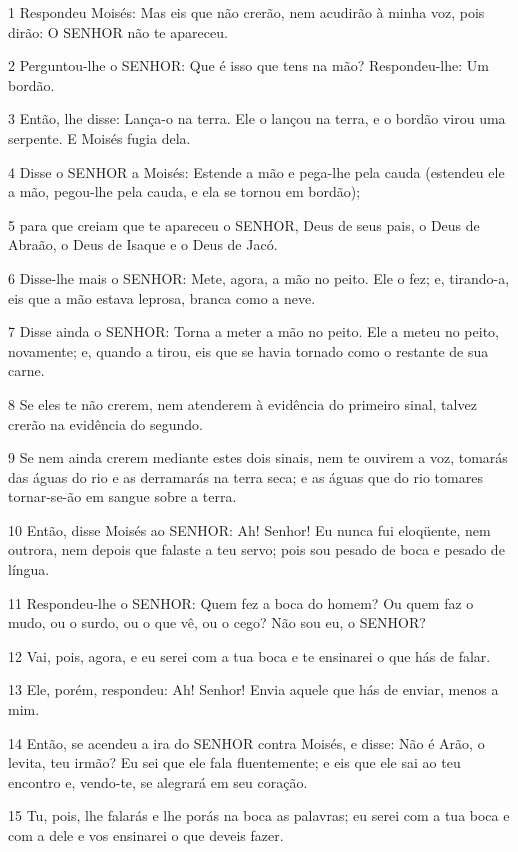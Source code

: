 \par 1 Respondeu Moisés: Mas eis que não crerão, nem acudirão à minha voz, pois dirão: O SENHOR não te apareceu.
\par 2 Perguntou-lhe o SENHOR: Que é isso que tens na mão? Respondeu-lhe: Um bordão.
\par 3 Então, lhe disse: Lança-o na terra. Ele o lançou na terra, e o bordão virou uma serpente. E Moisés fugia dela.
\par 4 Disse o SENHOR a Moisés: Estende a mão e pega-lhe pela cauda (estendeu ele a mão, pegou-lhe pela cauda, e ela se tornou em bordão);
\par 5 para que creiam que te apareceu o SENHOR, Deus de seus pais, o Deus de Abraão, o Deus de Isaque e o Deus de Jacó.
\par 6 Disse-lhe mais o SENHOR: Mete, agora, a mão no peito. Ele o fez; e, tirando-a, eis que a mão estava leprosa, branca como a neve.
\par 7 Disse ainda o SENHOR: Torna a meter a mão no peito. Ele a meteu no peito, novamente; e, quando a tirou, eis que se havia tornado como o restante de sua carne.
\par 8 Se eles te não crerem, nem atenderem à evidência do primeiro sinal, talvez crerão na evidência do segundo.
\par 9 Se nem ainda crerem mediante estes dois sinais, nem te ouvirem a voz, tomarás das águas do rio e as derramarás na terra seca; e as águas que do rio tomares tornar-se-ão em sangue sobre a terra.
\par 10 Então, disse Moisés ao SENHOR: Ah! Senhor! Eu nunca fui eloqüente, nem outrora, nem depois que falaste a teu servo; pois sou pesado de boca e pesado de língua.
\par 11 Respondeu-lhe o SENHOR: Quem fez a boca do homem? Ou quem faz o mudo, ou o surdo, ou o que vê, ou o cego? Não sou eu, o SENHOR?
\par 12 Vai, pois, agora, e eu serei com a tua boca e te ensinarei o que hás de falar.
\par 13 Ele, porém, respondeu: Ah! Senhor! Envia aquele que hás de enviar, menos a mim.
\par 14 Então, se acendeu a ira do SENHOR contra Moisés, e disse: Não é Arão, o levita, teu irmão? Eu sei que ele fala fluentemente; e eis que ele sai ao teu encontro e, vendo-te, se alegrará em seu coração.
\par 15 Tu, pois, lhe falarás e lhe porás na boca as palavras; eu serei com a tua boca e com a dele e vos ensinarei o que deveis fazer.
